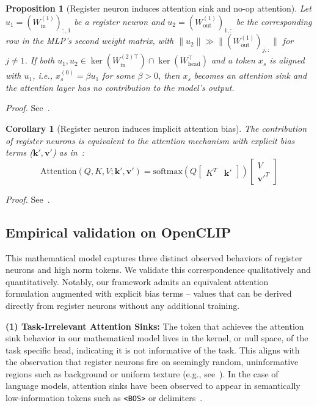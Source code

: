\documentclass{article}
\begin{document}
\newtheorem{proposition}{Proposition}
\begin{proposition}[Register neuron induces attention sink and no-op attention]
\label{prop:register_sink}
Let $u_1 = (W_{\text{in}}^{(1)})_{:, 1}$
be a register neuron and $u_2 = (W_{\text{out}}^{(1)})_{1, :}$
be the corresponding row in the MLP's second weight matrix, with $\|u_2\|
 \gg\|(W_{\text{out}}^{(1)})_{j,:}\|$ for $j \neq 1$.
If both $u_1, u_2 \in \ker(W_{\text{in}}^{(2)\top}) \cap \ker(W^\top_{\text{head}})$ and a token $x_s$ is aligned with $u_1$, i.e., $x^{(0)}_s = \beta u_1$ for some $\beta > 0$,
then $x_s$ becomes an attention sink and the attention layer has no contribution to the model's output.
\end{proposition}


\textit{Proof.} See~.

\newtheorem{corollary}{Corollary}
\begin{corollary}[Register neuron induces implicit attention bias]
\label{corollary:register_bias} The contribution of register neurons is equivalent to the attention mechanism with explicit bias terms  ($\mathbf{k}', \mathbf{v}'$) as in~\cite{sunmassive}: $$\text{Attention}(Q, K, V; \mathbf{k}', \mathbf{v}') = \text{softmax}\left( Q \begin{bmatrix} K^T & \mathbf{k}' \end{bmatrix} \right) \begin{bmatrix} V \\ \mathbf{v}'^T \end{bmatrix}$$ 
\end{corollary}

\textit{Proof.} See~.



\subsection{Empirical validation on OpenCLIP}
This mathematical model captures three distinct observed behaviors of register neurons and high norm tokens. We validate this correspondence qualitatively and quantitatively. Notably, our framework admits an equivalent attention formulation augmented with explicit bias terms -- values that can be derived directly from register neurons without any additional training.

\textbf{(1) Task-Irrelevant Attention Sinks:} The token that achieves the attention sink behavior in our mathematical model lives in the kernel, or null space, of the task specific head, indicating it is not informative of the task. This aligns with the observation that register neurons fire on seemingly random, uninformative regions such as background or uniform texture (e.g., see~). In the case of language models, attention sinks have been observed to appear in semantically low-information tokens such as \texttt{<BOS>} or delimiters~\citep{xiaoefficient}.
\end{document}
